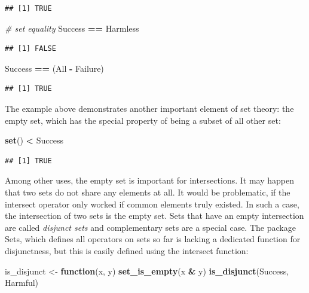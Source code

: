 \documentclass[]{svmono}
\newenvironment{Shaded}{\begin{snugshade}}{\end{snugshade}}
\newcommand{\KeywordTok}[1]{\textcolor[rgb]{0.13,0.29,0.53}{\textbf{#1}}}
\newcommand{\StringTok}[1]{\textcolor[rgb]{0.31,0.60,0.02}{#1}}
\newcommand{\CommentTok}[1]{\textcolor[rgb]{0.56,0.35,0.01}{\textit{#1}}}
\newcommand{\ControlFlowTok}[1]{\textcolor[rgb]{0.13,0.29,0.53}{\textbf{#1}}}
\newcommand{\OperatorTok}[1]{\textcolor[rgb]{0.81,0.36,0.00}{\textbf{#1}}}
\newcommand{\NormalTok}[1]{#1}
\begin{document}
\begin{verbatim}
## [1] TRUE
\end{verbatim}

\begin{Shaded}
\begin{Highlighting}[]
\CommentTok{# set equality}
\NormalTok{Success }\OperatorTok{==}\StringTok{ }\NormalTok{Harmless}
\end{Highlighting}
\end{Shaded}

\begin{verbatim}
## [1] FALSE
\end{verbatim}

\begin{Shaded}
\begin{Highlighting}[]
\NormalTok{Success }\OperatorTok{==}\StringTok{ }\NormalTok{(All }\OperatorTok{-}\StringTok{ }\NormalTok{Failure)}
\end{Highlighting}
\end{Shaded}

\begin{verbatim}
## [1] TRUE
\end{verbatim}

The example above demonstrates another important element of set theory:
the empty set, which has the special property of being a subset of all
other set:

\begin{Shaded}
\begin{Highlighting}[]
\KeywordTok{set}\NormalTok{() }\OperatorTok{<}\StringTok{ }\NormalTok{Success}
\end{Highlighting}
\end{Shaded}

\begin{verbatim}
## [1] TRUE
\end{verbatim}

Among other uses, the empty set is important for intersections. It may
happen that two sets do not share any elements at all. It would be
problematic, if the intersect operator only worked if common elements
truly existed. In such a case, the intersection of two sets is the empty
set. Sets that have an empty intersection are called \emph{disjunct
sets} and complementary sets are a special case. The package Sets, which
defines all operators on sets so far is lacking a dedicated function for
disjunctness, but this is easily defined using the intersect function:

\begin{Shaded}
\begin{Highlighting}[]
\NormalTok{is_disjunct <-}\StringTok{ }\ControlFlowTok{function}\NormalTok{(x, y) }\KeywordTok{set_is_empty}\NormalTok{(x }\OperatorTok{&}\StringTok{ }\NormalTok{y)}
\KeywordTok{is_disjunct}\NormalTok{(Success, Harmful)}
\end{Highlighting}
\end{Shaded}
\end{document}
